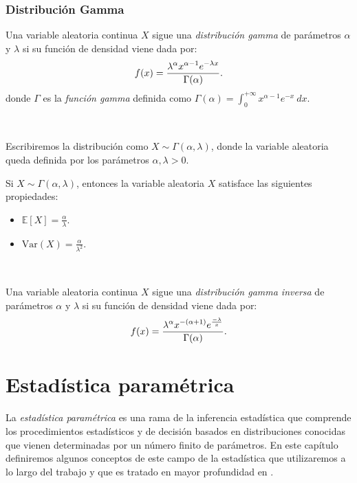 \documentclass[oneside,openright,titlepage,numbers=noenddot,openany,headinclude,footinclude=true,
cleardoublepage=empty,abstractoff,BCOR=5mm,paper=a4,fontsize=12pt,main=spanish]{scrreprt}
\begin{document}
\subsection*{Distribución Gamma}

\begin{definition}
Una variable aleatoria continua $X$ sigue una \textit{distribución gamma} de parámetros $\alpha$ y $\lambda$ si su función de densidad viene dada por: $$f(x)=\frac{\displaystyle \lambda^{\alpha}x^{\alpha-1}e^{-\lambda x}}{\displaystyle \Gamma(\alpha)}.$$
donde $\Gamma$ es la \textit{función gamma} definida como $\Gamma(\alpha)=\displaystyle \int_0^{+\infty}x^{\alpha-1}e^{-x} \ dx$.
\end{definition}\

Escribiremos la distribución como $X \sim \Gamma(\alpha,\lambda)$, donde la variable aleatoria queda definida por los parámetros $\alpha,\lambda > 0$.\\

\begin{proposition}[Propiedades]
Si $X \sim \Gamma(\alpha,\lambda)$, entonces la variable aleatoria $X$ satisface las siguientes propiedades:
\begin{itemize}
    \item $\mathbb{E}[X]=\frac{\alpha}{\lambda}$.
    \item $\text{Var}(X)=\frac{\alpha}{\lambda^2}$.
\end{itemize}
\end{proposition}\

\begin{definition}
Una variable aleatoria continua $X$ sigue una \textit{distribución gamma inversa} de parámetros $\alpha$ y $\lambda$ si su función de densidad viene dada por: $$f(x)=\frac{\displaystyle \lambda^\alpha x^{-(\alpha+1)} e^{\frac{-\lambda}{x}}}{\displaystyle \Gamma(\alpha)}.$$
\end{definition}

\chapter{Estadística paramétrica} \label{ch:estapar}

La \textit{estadística paramétrica} es una rama de la inferencia estadística que comprende los procedimientos estadísticos y de decisión basados en distribuciones conocidas que vienen determinadas por un número finito de parámetros. En este capítulo definiremos algunos conceptos de este campo de la estadística que utilizaremos a lo largo del trabajo y que es tratado en mayor profundidad en \cite{inferencia2012}.\\
\end{document}
